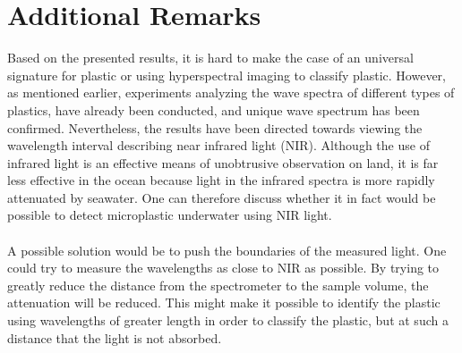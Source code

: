 \section{Additional Remarks}
Based on the presented results, it is hard to make the case of an universal signature for plastic or using hyperspectral imaging to classify plastic. However, as mentioned earlier, experiments analyzing the wave spectra of different types of plastics, have already been conducted, and unique wave spectrum has been confirmed. Nevertheless, the results have been directed towards viewing the wavelength interval describing near infrared light (NIR). Although the use of infrared light is an effective means of unobtrusive observation on land, it is far less effective in the ocean because light in the infrared spectra is more rapidly attenuated by seawater. One can therefore discuss whether it in fact would be possible to detect microplastic underwater using NIR light.
\\\\
A possible solution would be to push the boundaries of the measured light. One could try to measure the wavelengths as close to NIR as possible. By trying to greatly reduce the distance from the spectrometer to the sample volume, the attenuation will be reduced. This might make it possible to identify the plastic using wavelengths of greater length in order to classify the plastic, but at such a distance that the light is not absorbed.
\\\\
\\\\



